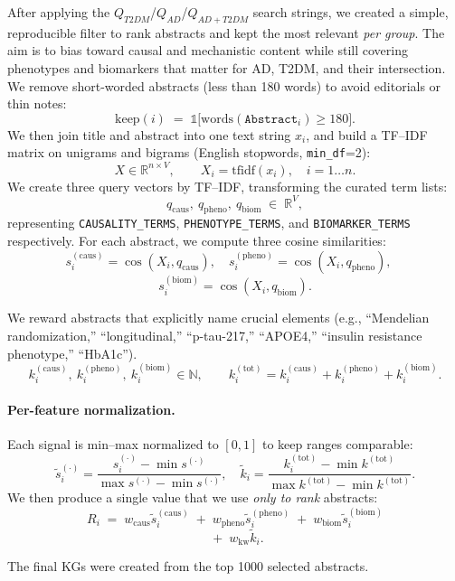 After applying the $Q_{T2DM}$/$Q_{AD}$/$Q_{AD + T2DM}$ search strings, we created a simple, reproducible filter to rank abstracts and kept the most relevant \emph{per group}. The aim is to bias toward causal and mechanistic content while still covering phenotypes and biomarkers that matter for AD, T2DM, and their intersection. We remove short-worded abstracts (less than 180 words) to avoid editorials or thin notes:
\[
\text{keep}(i)\;=\;\mathbb{1}\big[\mathrm{words}(\texttt{Abstract}_i)\ge 180\big].
\]
We then join title and abstract into one text string $x_i$, and build a TF--IDF matrix on unigrams and bigrams (English stopwords, \texttt{min\_df}=2):
\[
X \in \mathbb{R}^{n \times V},\qquad X_i=\mathrm{tfidf}(x_i),\quad i=1\ldots n.
\]
We create three query vectors by TF--IDF, transforming the curated term lists:
\[
q_{\mathrm{caus}},\ q_{\mathrm{pheno}},\ q_{\mathrm{biom}} \;\in\; \mathbb{R}^V,
\]
representing  \texttt{CAUSALITY\_TERMS}, \texttt{PHENOTYPE\_TERMS}, and \texttt{BIOMARKER\_TERMS} respectively. For each abstract, we compute three cosine similarities:
\[
s^{(\mathrm{caus})}_i=\cos(X_i,q_{\mathrm{caus}}),\quad
s^{(\mathrm{pheno})}_i=\cos(X_i,q_{\mathrm{pheno}}),\quad \]
\[
s^{(\mathrm{biom})}_i=\cos(X_i,q_{\mathrm{biom}}).
\]

We reward abstracts that explicitly name crucial elements (e.g., “Mendelian randomization,” “longitudinal,” “p-tau-217,” “APOE4,” “insulin resistance phenotype,” “HbA1c”).
\[
k^{(\mathrm{caus})}_i,\ k^{(\mathrm{pheno})}_i,\ k^{(\mathrm{biom})}_i \in \mathbb{N},\qquad
k^{(\mathrm{tot})}_i = k^{(\mathrm{caus})}_i + k^{(\mathrm{pheno})}_i + k^{(\mathrm{biom})}_i.
\]


\paragraph*{Per-feature normalization.}
Each signal is min--max normalized to $[0,1]$ to keep ranges comparable:
\[
\tilde{s}^{(\cdot)}_i=\frac{s^{(\cdot)}_i-\min s^{(\cdot)}}{\max s^{(\cdot)}-\min s^{(\cdot)}},\quad
\tilde{k}_i=\frac{k^{(\mathrm{tot})}_i-\min k^{(\mathrm{tot})}}{\max k^{(\mathrm{tot})}-\min k^{(\mathrm{tot})}}.
\]
We then produce a single value that we use \emph{only to rank} abstracts:
\[
R_i \;=\; w_{\mathrm{caus}}\tilde{s}^{(\mathrm{caus})}_i
\;+\; w_{\mathrm{pheno}}\tilde{s}^{(\mathrm{pheno})}_i
\;+\; w_{\mathrm{biom}}\tilde{s}^{(\mathrm{biom})}_i \]
\[
\;+\; w_{\mathrm{kw}}\tilde{k}_i.\]

The final KGs were created from the top 1000 selected abstracts. 

